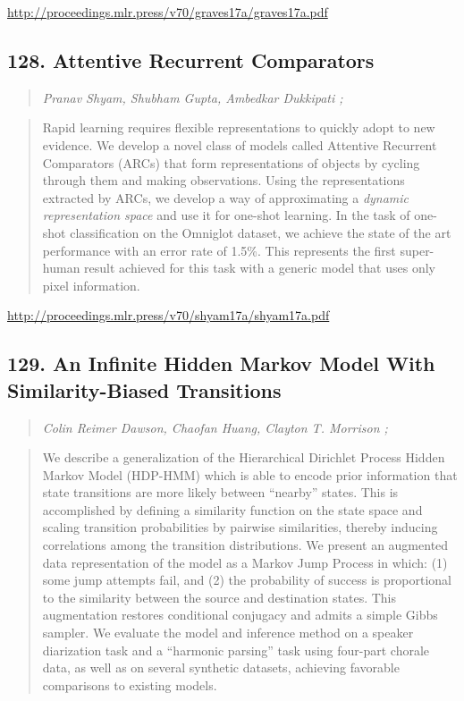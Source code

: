 \documentclass{article}
\begin{document}
\href{http://proceedings.mlr.press/v70/graves17a/graves17a.pdf}{http://proceedings.mlr.press/v70/graves17a/graves17a.pdf}

\subsection{128. Attentive Recurrent Comparators}

\begin{quote}
\footnotesize{\textit{Pranav Shyam, Shubham Gupta, Ambedkar Dukkipati ;}}

\end{quote}

\begin{quote}
    Rapid learning requires flexible representations to quickly adopt to new evidence. We develop a novel class of models called Attentive Recurrent Comparators (ARCs) that form representations of objects by cycling through them and making observations. Using the representations extracted by ARCs, we develop a way of approximating a \textit{dynamic representation space} and use it for one-shot learning. In the task of one-shot classification on the Omniglot dataset, we achieve the state of the art performance with an error rate of 1.5\%. This represents the first super-human result achieved for this task with a generic model that uses only pixel information.  
\end{quote}

\href{http://proceedings.mlr.press/v70/shyam17a/shyam17a.pdf}{http://proceedings.mlr.press/v70/shyam17a/shyam17a.pdf}

\subsection{129. An Infinite Hidden Markov Model With Similarity-Biased Transitions}

\begin{quote}
\footnotesize{\textit{Colin Reimer Dawson, Chaofan Huang, Clayton T. Morrison ;}}

\end{quote}

\begin{quote}
    We describe a generalization of the Hierarchical Dirichlet Process Hidden Markov Model (HDP-HMM) which is able to encode prior information that state transitions are more likely between “nearby” states. This is accomplished by defining a similarity function on the state space and scaling transition probabilities by pairwise similarities, thereby inducing correlations among the transition distributions. We present an augmented data representation of the model as a Markov Jump Process in which: (1) some jump attempts fail, and (2) the probability of success is proportional to the similarity between the source and destination states. This augmentation restores conditional conjugacy and admits a simple Gibbs sampler. We evaluate the model and inference method on a speaker diarization task and a “harmonic parsing” task using four-part chorale data, as well as on several synthetic datasets, achieving favorable comparisons to existing models.  
\end{quote}
\end{document}
